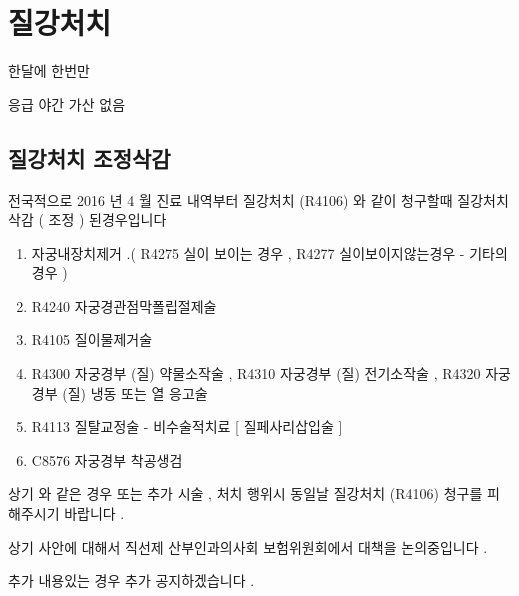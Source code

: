 \section{질강처치}
%
{한달에 한번만\par
응급 야간 가산 없음}

\subsection{질강처치 조정삭감}
전국적으로 2016 년 4 월 진료 내역부터 질강처치 (R4106) 와 같이 청구할때 질강처치 삭감 ( 조정 ) 된경우입니다\par
\begin{enumerate}\tightlist
\item 자궁내장치제거 .( R4275 실이 보이는 경우 , R4277 실이보이지않는경우 - 기타의 경우 )
\item R4240 자궁경관점막폴립절제술
\item R4105 질이물제거술
\item R4300 자궁경부 (질) 약물소작술 , R4310 자궁경부 (질) 전기소작술 , R4320 자궁경부 (질) 냉동 또는 열 응고술
\item R4113 질탈교정술 - 비수술적치료 [ 질페사리삽입술 ]
\item C8576 자궁경부 착공생검
 \end{enumerate} 
상기 와 같은 경우 또는 추가 시술 , 처치 행위시 동일날 질강처치 (R4106) 청구를 피해주시기 바랍니다 .\par
상기 사안에 대해서 직선제 산부인과의사회 보험위원회에서 대책을 논의중입니다 .\par
추가 내용있는 경우 추가 공지하겠습니다 .\par